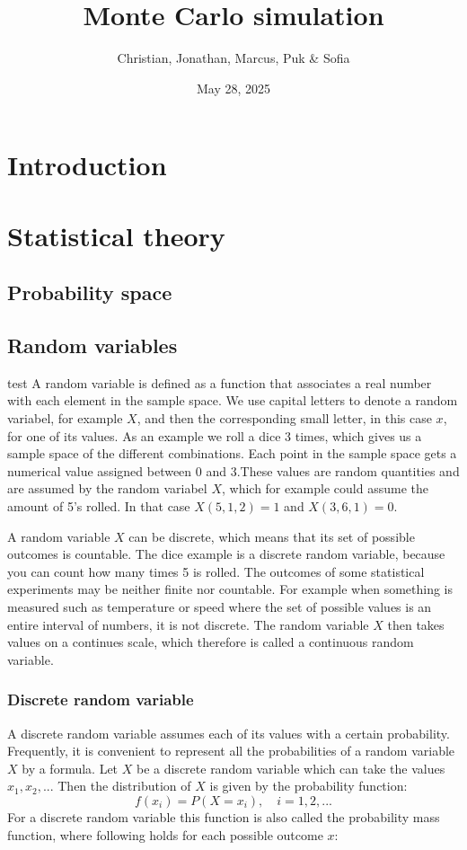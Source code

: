 \documentclass{article}
\title{Monte Carlo simulation}
\author{Christian, Jonathan, Marcus, Puk \& Sofia }
\date{May 28, 2025}
\begin{document}
	\maketitle
	\newpage
	\tableofcontents
	\newpage
	\section{Introduction}
	\newpage
	\section{Statistical theory}
	\subsection{Probability space}
	\subsection{Random variables}
	test
	A random variable is defined as a function that associates a real number with each element in the sample space. We use capital letters to denote a random variabel, for example $X$, and then the corresponding small letter, in this case $x$, for one of its values. As an example we roll a dice 3 times, which gives us a sample space of the different combinations. Each point in the sample space gets a numerical value assigned between 0 and 3.These values are random quantities and are assumed by the random variabel $X$, which for example could assume the amount of 5's rolled. In that case $X(5,1,2) = 1$ and $X(3,6,1) = 0$.
	\newline
	
	 A random variable $X$ can be discrete, which means that its set of possible outcomes is countable. The dice example is a discrete random variable, because you can count how many times 5 is rolled. The outcomes of some statistical experiments may be neither finite nor countable. For example when something is measured such as temperature or speed where the set of possible values is an entire interval of numbers, it is not discrete. The random variable $X$ then takes values on a continues scale, which therefore is called a continuous random variable.
	
	\subsubsection{Discrete random variable}
	A discrete random variable assumes each of its values with a certain probability. Frequently, it is convenient to represent all the probabilities of a random variable $X$ by a formula. Let $X$ be a discrete random variable which can take the values $x_{1}, x_{2},...$ Then the distribution of $X$ is given by the probability function:
	$$f(x_{i})=P(X=x_{i}),\quad i=1,2,...$$
	\newline
	For a discrete random variable this function is also called the probability mass function, where following holds for each possible outcome $x$:
	
\end{document}
